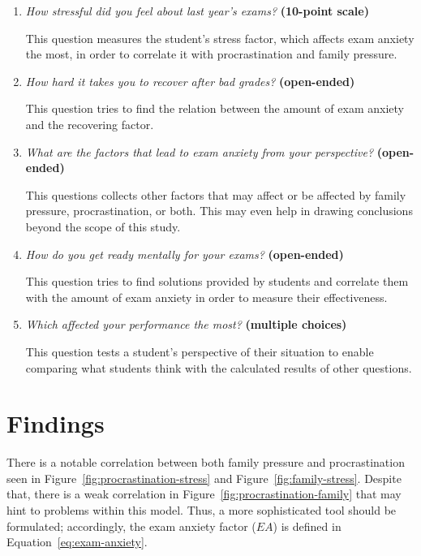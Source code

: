 \documentclass[12pt]{report}
\begin{document}
\begin{multicols}{2}
\begin{enumerate}[wide, labelwidth=!, labelindent=0pt]
\item \textit{How stressful did you feel about last year's exams?}
\textbf{(10-point scale)}

This question measures the student's stress factor, which affects exam anxiety
the most, in order to correlate it with procrastination and family pressure.

\item \textit{How hard it takes you to recover after bad grades?}
\textbf{(open-ended)}

This question tries to find the relation between the amount of exam anxiety
and the recovering factor.

\item \textit{What are the factors that lead to exam anxiety from your
perspective?}
\textbf{(open-ended)}

This questions collects other factors that may affect or be affected by family
pressure, procrastination, or both. This may even help in drawing conclusions
beyond the scope of this study.

\item \textit{How do you get ready mentally for your exams?}
\textbf{(open-ended)}

This question tries to find solutions provided by students and correlate them
with the amount of exam anxiety in order to measure their effectiveness.

\item \textit{Which affected your performance the most?}
\textbf{(multiple choices)}

This question tests a student's perspective of their situation to enable comparing
what students think with the calculated results of other questions.

\end{enumerate}

\section{Findings}

There is a notable correlation between both family pressure and procrastination
seen in Figure~\ref{fig:procrastination-stress} and
Figure~\ref{fig:family-stress}. Despite that, there is a weak correlation in
Figure~\ref{fig:procrastination-family} that may hint to problems within this
model. Thus, a more sophisticated tool should be formulated; accordingly, the
exam anxiety factor ($EA$) is defined in Equation~\ref{eq:exam-anxiety}.


\end{multicols}
\end{document}
